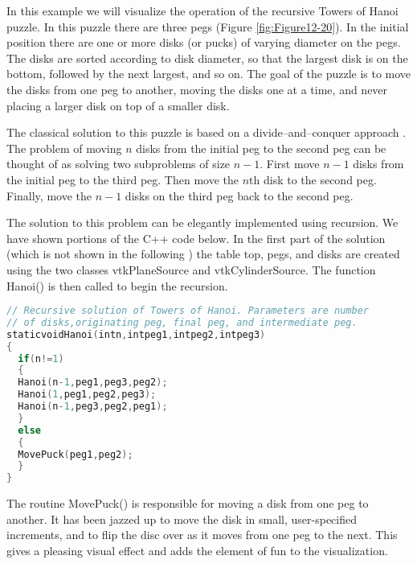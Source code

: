In this example we will visualize the operation of the recursive Towers of Hanoi puzzle. In this puzzle there are three pegs (Figure \ref{fig:Figure12-20}). In the initial position there are one or more disks (or pucks) of varying diameter on the pegs. The disks are sorted according to disk diameter, so that the largest disk is on the bottom, followed by the next largest, and so on. The goal of the puzzle is to move the disks from one peg to another, moving the disks one at a time, and never placing a larger disk on top of a smaller disk.

The classical solution to this puzzle is based on a divide--and--conquer
approach \cite{AhoHopUll83}. The problem of moving \emph{$n$} disks from the
initial peg to the second peg can be thought of as solving two subproblems of size \emph{$n - 1$}. First move \emph{$n - 1$} disks from the initial peg to the third peg. Then move the $n$th disk to the second peg. Finally, move the \emph{$n - 1$} disks on the third peg back to the second
peg.

The solution to this problem can be elegantly implemented using recursion. We have shown portions of the C++ code below.
In the first part of the solution (which is not shown in the following ) the table top, pegs, and disks are created using the two classes vtkPlaneSource and vtkCylinderSource. The function Hanoi() is then called to begin the recursion.

\begin{lstlisting}[language=C++, caption={Recursive solution for the Towers of Hanoi.}]
// Recursive solution of Towers of Hanoi. Parameters are number
// of disks,originating peg, final peg, and intermediate peg.
staticvoidHanoi(intn,intpeg1,intpeg2,intpeg3)
{
  if(n!=1)
  {
  Hanoi(n-1,peg1,peg3,peg2);
  Hanoi(1,peg1,peg2,peg3);
  Hanoi(n-1,peg3,peg2,peg1);
  }
  else
  {
  MovePuck(peg1,peg2);
  }
}
\end{lstlisting}

The routine MovePuck() is responsible for moving a disk from one peg to another. It has been jazzed up to move the disk in small, user-specified increments, and to flip the disc over as it moves from one peg to the next. This gives a pleasing visual effect and adds the element of fun to the visualization.

